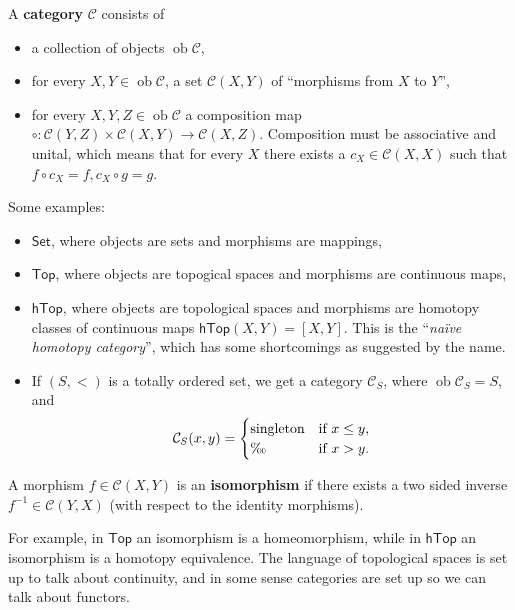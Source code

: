 \begin{definition}[Categories]
    A \textbf{category} $\mathcal{C} $ consists of
    \begin{itemize}
    \setlength\itemsep{-.2em}
\item a collection of objects $ \operatorname{ob}\mathcal{C} $,
\item for every $X, Y \in \operatorname{ob}\mathcal{C} $, a set $\mathcal{C} (X,Y)$ of ``morphisms from $X$ to $Y$'',
\item for every $X,Y,Z \in \operatorname{ob}\mathcal{C} $ a composition map $ \circ \colon \mathcal{C} (Y,Z) \times \mathcal{C} (X,Y) \to \mathcal{C} (X,Z)$. Composition must be associative and unital, which means that for every $X$ there exists a $c_X \in \mathcal{C} (X,X)$ such that $f \circ c_X=f, c_X \circ g=g$.
    \end{itemize}
\end{definition}
\begin{example}
    Some examples:
    \begin{itemize}
    \setlength\itemsep{-.2em}
        \item $\mathsf{Set} $, where objects are sets and morphisms are mappings,
        \item $\mathsf{Top} $, where objects are topogical spaces and morphisms are continuous maps,
        \item  $\mathsf{hTop} $, where objects are topological spaces and morphisms are homotopy classes of continuous maps $ \mathsf{hTop}(X,Y)=[X,Y] $. This is the ``\emph{na\"ive homotopy category}'', which has some shortcomings as suggested by the name.
        \item If  $(S,<)$ is a totally ordered set, we get a category $\mathcal{C} _S $, where $\operatorname{ob}\mathcal{C} _S=S$, and \[
                \mathcal{C} _S (x,y)=
                \begin{cases}
                    \text{singleton} & \text{if} \ x \leq y,\\
                    \O & \text{if} \ x >y.
                \end{cases}
        \] 
    \end{itemize}
\end{example}

\begin{definition}[Isomorphisms]
    A morphism $f \in \mathcal{C} (X,Y)$ is an \textbf{isomorphism} if there exists a two sided inverse $f ^{-1} \in \mathcal{C} (Y,X)$ (with respect to the identity morphisms).
\end{definition}
For example, in $\mathsf{Top} $ an isomorphism is a homeomorphism, while in $\mathsf{hTop} $ an isomorphism is a homotopy equivalence. The language of topological spaces is set up to talk about continuity, and in some sense categories are set up so we can talk about functors.


